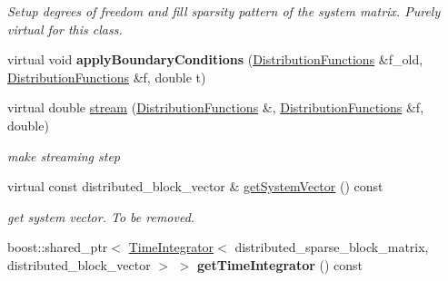 \begin{DoxyCompactItemize}
\begin{DoxyCompactList}\small\item\em Setup degrees of freedom and fill sparsity pattern of the system matrix. Purely virtual for this class. \item\end{DoxyCompactList}\item 
\hypertarget{classnatrium_1_1SEDGMinLee_a999ba2ec978258854ccbf1f11f68e642}{
virtual void {\bfseries applyBoundaryConditions} (\hyperlink{classnatrium_1_1DistributionFunctions}{DistributionFunctions} \&f\_\-old, \hyperlink{classnatrium_1_1DistributionFunctions}{DistributionFunctions} \&f, double t)}
\label{classnatrium_1_1SEDGMinLee_a999ba2ec978258854ccbf1f11f68e642}

\item 
\hypertarget{classnatrium_1_1SEDGMinLee_a6a343b581a1e2ffdf0806b140ca82c9e}{
virtual double \hyperlink{classnatrium_1_1SEDGMinLee_a6a343b581a1e2ffdf0806b140ca82c9e}{stream} (\hyperlink{classnatrium_1_1DistributionFunctions}{DistributionFunctions} \&, \hyperlink{classnatrium_1_1DistributionFunctions}{DistributionFunctions} \&f, double)}
\label{classnatrium_1_1SEDGMinLee_a6a343b581a1e2ffdf0806b140ca82c9e}

\begin{DoxyCompactList}\small\item\em make streaming step \item\end{DoxyCompactList}\item 
\hypertarget{classnatrium_1_1SEDGMinLee_ac4d17489cf8bf5e98bd7bd4e3e32f0d4}{
virtual const distributed\_\-block\_\-vector \& \hyperlink{classnatrium_1_1SEDGMinLee_ac4d17489cf8bf5e98bd7bd4e3e32f0d4}{getSystemVector} () const }
\label{classnatrium_1_1SEDGMinLee_ac4d17489cf8bf5e98bd7bd4e3e32f0d4}

\begin{DoxyCompactList}\small\item\em get system vector. To be removed. \item\end{DoxyCompactList}\item 
\hypertarget{classnatrium_1_1SEDGMinLee_a13a865449ffb61a8ab3685183297bf25}{
boost::shared\_\-ptr$<$ \hyperlink{classnatrium_1_1TimeIntegrator}{TimeIntegrator}$<$ distributed\_\-sparse\_\-block\_\-matrix, distributed\_\-block\_\-vector $>$ $>$ {\bfseries getTimeIntegrator} () const }
\label{classnatrium_1_1SEDGMinLee_a13a865449ffb61a8ab3685183297bf25}


\end{DoxyCompactItemize}
